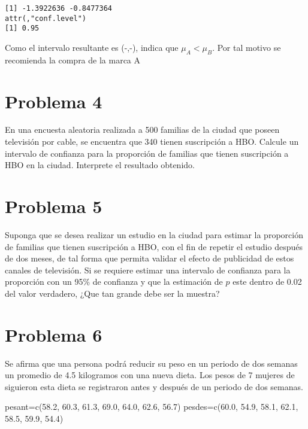 \documentclass[
]{article}
\newenvironment{Shaded}{\begin{snugshade}}{\end{snugshade}}
\newcommand{\FloatTok}[1]{\textcolor[rgb]{0.00,0.00,0.81}{#1}}
\newcommand{\FunctionTok}[1]{\textcolor[rgb]{0.00,0.00,0.00}{#1}}
\newcommand{\NormalTok}[1]{#1}
\newcommand{\OtherTok}[1]{\textcolor[rgb]{0.56,0.35,0.01}{#1}}
\begin{document}
\begin{verbatim}
[1] -1.3922636 -0.8477364
attr(,"conf.level")
[1] 0.95
\end{verbatim}

Como el intervalo resultante es (-,-), indica que \(\mu_{A} < \mu_{B}\).
Por tal motivo se recomienda la compra de la marca A

\hypertarget{problema-4}{%
\section{\texorpdfstring{\textbf{Problema
4}}{Problema 4}}\label{problema-4}}

En una encuesta aleatoria realizada a 500 familias de la ciudad que
poseen televisión por cable, se encuentra que 340 tienen suscripción a
HBO. Calcule un intervalo de confianza para la proporción de familias
que tienen suscripción a HBO en la ciudad. Interprete el resultado
obtenido.

\hypertarget{problema-5}{%
\section{\texorpdfstring{\textbf{Problema
5}}{Problema 5}}\label{problema-5}}

Suponga que se desea realizar un estudio en la ciudad para estimar la
proporción de familias que tienen suscripción a HBO, con el fin de
repetir el estudio después de dos meses, de tal forma que permita
validar el efecto de publicidad de estos canales de televisión. Si se
requiere estimar una intervalo de confianza para la proporción con un
95\% de confianza y que la estimación de \(p\) este dentro de 0.02 del
valor verdadero, ¿Que tan grande debe ser la muestra?

\hypertarget{problema-6}{%
\section{\texorpdfstring{\textbf{Problema
6}}{Problema 6}}\label{problema-6}}

Se afirma que una persona podrá reducir su peso en un periodo de dos
semanas un promedio de 4.5 kilogramos con una nueva dieta. Los pesos de
7 mujeres de siguieron esta dieta se registraron antes y después de un
periodo de dos semanas.

\begin{Shaded}
\begin{Highlighting}[]
\NormalTok{pesant}\OtherTok{=}\FunctionTok{c}\NormalTok{(}\FloatTok{58.2}\NormalTok{, }\FloatTok{60.3}\NormalTok{, }\FloatTok{61.3}\NormalTok{, }\FloatTok{69.0}\NormalTok{, }\FloatTok{64.0}\NormalTok{, }\FloatTok{62.6}\NormalTok{, }\FloatTok{56.7}\NormalTok{)}
\NormalTok{pesdes}\OtherTok{=}\FunctionTok{c}\NormalTok{(}\FloatTok{60.0}\NormalTok{, }\FloatTok{54.9}\NormalTok{, }\FloatTok{58.1}\NormalTok{, }\FloatTok{62.1}\NormalTok{, }\FloatTok{58.5}\NormalTok{, }\FloatTok{59.9}\NormalTok{, }\FloatTok{54.4}\NormalTok{)}
\end{Highlighting}
\end{Shaded}
\end{document}
